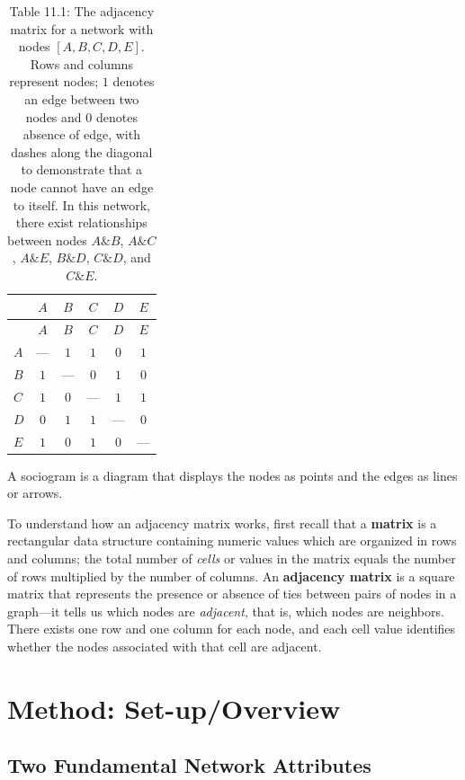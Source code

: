 \documentclass{book}
\begin{document}
\begin{longtable}[]{@{}lccccc@{}}
\caption{Table 11.1: The adjacency matrix for a network with nodes
\([A, B, C, D, E]\). Rows and columns represent nodes; \(1\) denotes an edge
between two nodes and \(0\) denotes absence of edge, with dashes along the
diagonal to demonstrate that a node cannot have an edge to itself. In this
network, there exist relationships between nodes \(A \& B\), \(A \& C\),
\(A \& E\), \(B \& D\), \(C \& D\), and \(C \& E\).}\tabularnewline
\toprule
& \(A\) & \(B\) & \(C\) & \(D\) & \(E\) \\
\midrule
\endfirsthead
\toprule
& \(A\) & \(B\) & \(C\) & \(D\) & \(E\) \\
\midrule
\endhead
\(A\) & --- & \(1\) & \(1\) & \(0\) & \(1\) \\
\(B\) & \(1\) & --- & \(0\) & \(1\) & \(0\) \\
\(C\) & \(1\) & \(0\) & --- & \(1\) & \(1\) \\
\(D\) & \(0\) & \(1\) & \(1\) & --- & \(0\) \\
\(E\) & \(1\) & \(0\) & \(1\) & \(0\) & --- \\
\bottomrule
\end{longtable}

A sociogram is a diagram that displays the nodes as points and the edges as
lines or arrows.

To understand how an adjacency matrix works, first recall that a
\textbf{matrix} is a rectangular data structure containing numeric values
which are organized in rows and columns; the total number of \emph{cells} or
values in the matrix equals the number of rows multiplied by the number of
columns. An \textbf{adjacency matrix} is a square matrix that represents the
presence or absence of ties between pairs of nodes in a graph---it tells us
which nodes are \emph{adjacent}, that is, which nodes are neighbors. There
exists one row and one column for each node, and each cell value identifies
whether the nodes associated with that cell are adjacent.

\hypertarget{method-set-upoverview}{%
\section{Method: Set-up/Overview}\label{method-set-upoverview}}

\hypertarget{two-fundamental-network-attributes}{%
\subsection{Two Fundamental Network
Attributes}\label{two-fundamental-network-attributes}}
\end{document}
